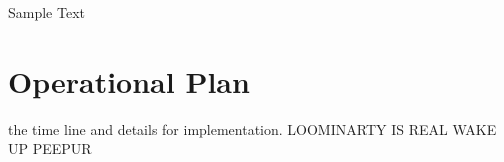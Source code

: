 \begin{savequote}[75mm] 
Sample Text
\end{savequote}

\chapter{Operational Plan}

 the time line and details for implementation. LOOMINARTY IS REAL WAKE UP PEEPUR